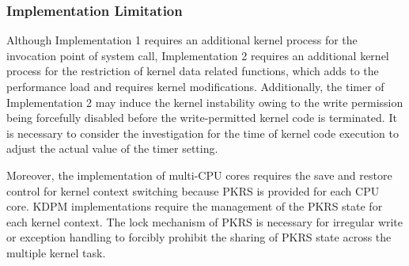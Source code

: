 
\subsubsection{Implementation Limitation}
Although Implementation 1 requires an additional kernel process for the
invocation point of system call,
%
Implementation 2 requires an additional kernel process for the restriction of
kernel data related functions, which adds to the performance load and requires
kernel modifications. 
%
Additionally, the timer of Implementation 2 may induce the kernel instability
owing to the write permission being forcefully disabled before the
write-permitted kernel code is terminated. 
It is necessary to consider the investigation for the time of kernel code
execution to adjust the actual value of the timer setting.
%

Moreover, the implementation of multi-CPU cores requires the save and restore
control for kernel context switching because PKRS is provided for each CPU core.
KDPM implementations require the management of the PKRS state for each kernel
context. 
%
The lock mechanism of PKRS is necessary for irregular write or exception
handling to forcibly prohibit the sharing of PKRS state across the multiple
kernel task.



